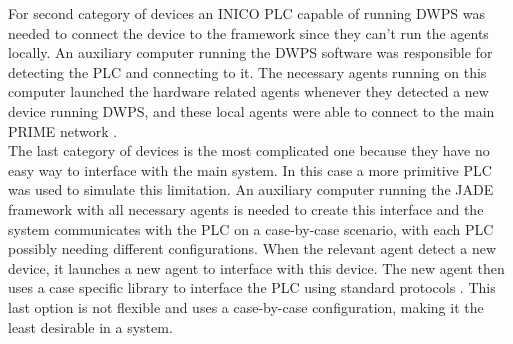 For second category of devices an INICO PLC capable of running DWPS was needed to connect the device to the framework since they can't run the agents locally. An auxiliary computer running the DWPS software was responsible for detecting the PLC and connecting to it. The necessary agents running on this computer launched the hardware related agents whenever they detected a new device running DWPS, and these local agents were able to connect to the main PRIME network \cite{PRIME_plug_and_produce}.\\

The last category of devices is the most complicated one because they have no easy way to interface with the main system. In this case a more primitive PLC was used to simulate this limitation. An auxiliary computer running the JADE framework with all necessary agents is needed to create this interface and the system communicates with the PLC on a case-by-case scenario, with each PLC possibly needing different configurations. When the relevant agent detect a new device, it launches a new agent to interface with this device. The new agent then uses a case specific library to interface the PLC using standard protocols \cite{PRIME_plug_and_produce}. This last option is not flexible and uses a case-by-case configuration, making it the least desirable in a system.
